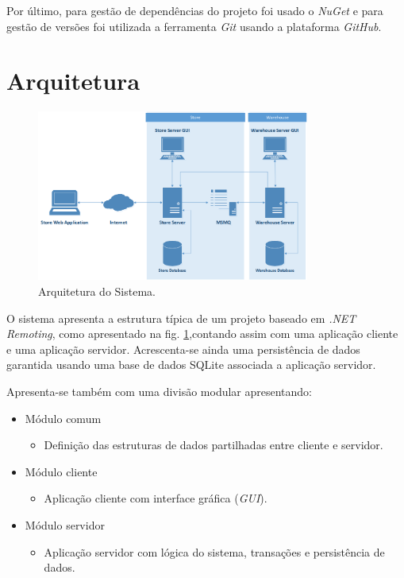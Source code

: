 \documentclass[12pt]{article}
\begin{document}
Por último, para gestão de dependências do projeto foi usado o \textit{NuGet} e para gestão de versões foi utilizada a ferramenta \textit{Git} usando a plataforma \textit{GitHub}.


\section{Arquitetura}

\begin{figure}[h!]
    \centering
    \includegraphics[width=0.8\textwidth]{arch.png}
    \caption{Arquitetura do Sistema.}
    \label{fig:arch}
\end{figure}

O sistema apresenta a estrutura típica de um projeto baseado em \textit{.NET Remoting}, como apresentado na fig. \ref{fig:arch},contando assim com uma aplicação cliente e uma aplicação servidor. Acrescenta-se ainda uma persistência de dados garantida usando uma base de dados SQLite associada a aplicação servidor.

Apresenta-se também com uma divisão modular apresentando:
\begin{itemize}
\item Módulo comum
\begin{itemize}
\item Definição das estruturas de dados partilhadas entre cliente e servidor.
\end{itemize}
\item Módulo cliente
\begin{itemize}
\item Aplicação cliente com interface gráfica (\textit{GUI}).
\end{itemize}
\item Módulo servidor
\begin{itemize}
\item Aplicação servidor com lógica do sistema, transações e persistência de dados.
\end{itemize}
\end{itemize}
\end{document}
